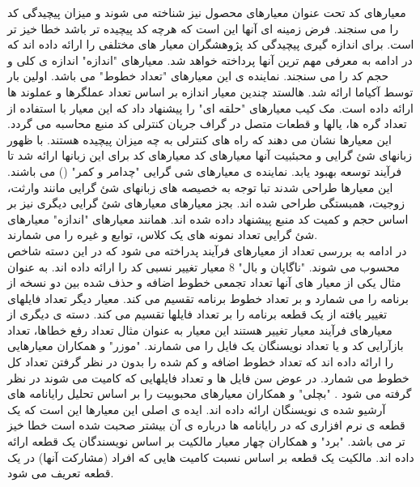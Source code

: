 معیارهای کد تحت عنوان معیارهای محصول 
نیز شناخته می شوند و میزان پیچیدگی کد را می سنجند. فرض زمینه ای آنها این است که هرچه کد پیچیده تر باشد خطا خیز تر است. برای اندازه گیری پیچیدگی کد پژوهشگران معیار های مختلفی را ارائه داده اند که در ادامه به معرفی مهم ترین آنها پرداخته خواهد شد. معیارهای "اندازه" اندازه ی کلی و حجم کد را می سنجند. نماینده ی این معیارهای "تعداد خطوط" می باشد. اولین بار توسط آکیاما  \cite{akiyama1971example}  ارائه شد. هالستد  \cite{halstead1977elements} چندین معیار اندازه بر اساس  تعداد عملگرها و عملوند ها ارائه داده است. مک کیب معیارهای "حلقه ای" 
را پیشنهاد داد که این معیار با استفاده از تعداد گره ها، یالها و قطعات متصل در گراف جریان کنترلی کد منبع محاسبه می گردد\cite{mccabe1976complexity}. این معیارها نشان می دهند که راه های کنترلی به چه میزان پیچیده هستند. با ظهور زبانهای شئ گرایی و محبئبیت آنها معیارهای کد معیارهای کد برای این زبانها ارائه شد تا فرآیند توسعه بهبود یابد. نماینده ی معیارهای شی گرایی "چدامر و کمر" () می باشند\cite{chidamber1994metrics}. این معیارها طراحی شدند تبا توجه به خصیصه های زبانهای شئ گرایی مانند وارثت، زوجیت، همبستگی طراحی شده اند. بجز معیارهای  معیارهای شئ گرایی دیگری نیز بر اساس حجم و کمیت کد منبع پیشنهاد داده شده اند. همانند معیارهای "اندازه" معیارهای شئ گرایی تعداد نمونه های یک کلاس، توابع و غیره را می شمارند. \\
در ادامه به بررسی تعداد از معیارهای فرآیند پدراخته می شود که در این دسته شاخص محسوب می شوند. "ناگاپان و بال" 8 معیار تغییر نسبی کد را ارائه داده اند\cite{nagappan2005use}. به عنوان مثال یکی از معیار های آنها تعداد تجمعی خطوط اضافه و حذف شده بین دو نسخه از برنامه را می شمارد و بر تعداد خطوط برنامه تقسیم می کند. معیار دیگر تعداد فایلهای تغییر یافته از یک قطعه برنامه را بر تعداد فایلها تقسیم می کند. دسته ی دیگری از معیارهای فرآیند معیار تغییر هستند این معیار به عنوان مثال تعداد رفع خطاها، تعداد بازآرایی کد  و یا تعداد نویسنگان یک فایل را می شمارند. "موزر" و همکاران معیارهایی را ارائه داده اند که تعداد خطوط اضافه و کم شده را بدون در نظر گرفتن تعداد کل خطوط می شمارد. در عوض سن فایل ها و تعداد فایلهایی که کامیت می شوند در نظر گرفته می شود \cite{moser2008comparative}.  "بچلی" و همکاران معیارهای محبوبیت را بر اساس تحلیل رایانامه های آرشیو شده ی نویسنگان ارائه داده اند. ایده ی اصلی این معیارها این است که یک قطعه ی  نرم افزاری که در رایانامه ها درباره ی آن بیشتر صحبت شده است خطا خیز تر می باشد\cite{bacchelli2010popular}. "برد" و همکاران چهار معیار مالکیت بر اساس نویسندگان یک قطعه ارائه داده اند. مالکیت یک قطعه بر اساس نسبت کامیت هایی که افراد (مشارکت آنها) در یک قطعه  تعریف می شود. \\

